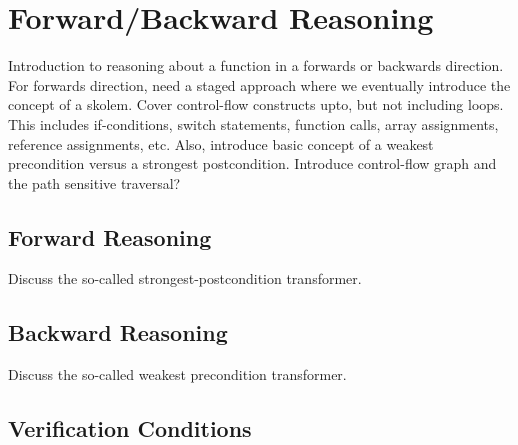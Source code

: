 \section{Forward/Backward Reasoning}

Introduction to reasoning about a function in a forwards or backwards direction.  For forwards direction, need a staged approach where we eventually introduce the concept of a skolem.  Cover control-flow constructs upto, but not including loops.  This includes if-conditions, switch statements, function calls, array assignments, reference assignments, etc.  Also, introduce basic concept of a weakest precondition versus a strongest postcondition.  Introduce control-flow graph and the path sensitive traversal?

\subsection{Forward Reasoning}
Discuss the so-called strongest-postcondition transformer.

\subsection{Backward Reasoning}
Discuss the so-called weakest precondition transformer.

\subsection{Verification Conditions}